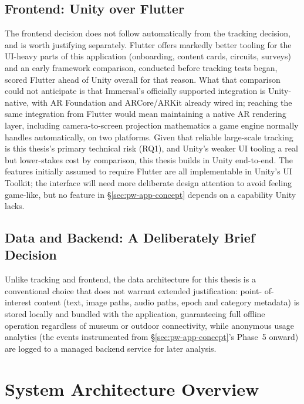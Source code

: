 \begin{aitemize}[nosep]
\subsection*{Frontend: Unity over Flutter}
 
The frontend decision does not follow automatically from the tracking
decision, and is worth justifying separately. Flutter offers markedly
better tooling for the UI-heavy parts of this application (onboarding, content cards, circuits, surveys) and an early framework comparison,
conducted before tracking tests began, scored Flutter ahead of Unity
overall for that reason. What that comparison could not anticipate is
that Immersal's officially supported integration is Unity-native, with
AR Foundation and ARCore/ARKit already wired in; reaching the same
integration from Flutter would mean maintaining a native AR rendering
layer, including camera-to-screen projection mathematics a game engine
normally handles automatically, on two platforms. Given that reliable
large-scale tracking is this thesis's primary technical risk (RQ1), and
Unity's weaker UI tooling a real but lower-stakes cost by comparison,
this thesis builds in Unity end-to-end. The features initially assumed
to require Flutter are all implementable in Unity's UI Toolkit; the
interface will need more deliberate design attention to avoid feeling
game-like, but no feature in \S\ref{sec:pw-app-concept} depends on a
capability Unity lacks.
 
\subsection*{Data and Backend: A Deliberately Brief Decision}
 
Unlike tracking and frontend, the data architecture for this thesis is a
conventional choice that does not warrant extended justification: point-
of-interest content (text, image paths, audio paths, epoch and category
metadata) is stored locally and bundled with the application, guaranteeing
full offline operation regardless of museum or outdoor connectivity,
while anonymous usage analytics (the events instrumented from \S\ref{sec:pw-app-concept}'s Phase~5 onward) are logged to a managed
backend service for later analysis. 




\section{System Architecture Overview}
\label{sec:pw-architecture}
 

\end{aitemize}
